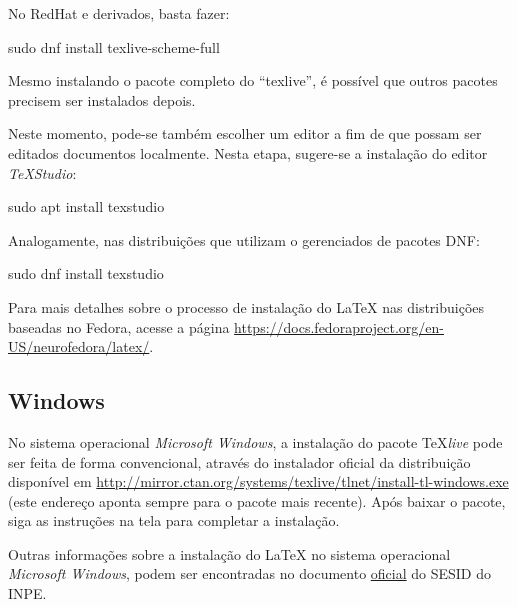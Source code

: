 No RedHat e derivados, basta fazer:

\begin{meucomando}
sudo dnf install texlive-scheme-full
\end{meucomando}

\begin{marker}
Mesmo instalando o pacote completo do ``texlive'', é possível que outros pacotes precisem ser instalados depois.
\end{marker}

Neste momento, pode-se também escolher um editor a fim de que possam ser editados documentos localmente. Nesta etapa, sugere-se a instalação do editor \textit{TeXStudio}:

\begin{meucomando}
sudo apt install texstudio
\end{meucomando}

Analogamente, nas distribuições que utilizam o gerenciados de pacotes DNF:

\begin{meucomando}
sudo dnf install texstudio
\end{meucomando}

\begin{marker}
Para mais detalhes sobre o processo de instalação do \LaTeX{} nas distribuições baseadas no Fedora, acesse a página \url{https://docs.fedoraproject.org/en-US/neurofedora/latex/}. 
\end{marker}

\subsection*{Windows}
\label{sec:windows}

No sistema operacional \textit{Microsoft Windows}, a instalação do pacote \TeX \textit{live} pode ser feita de forma convencional, através do instalador oficial da distribuição disponível em \url{http://mirror.ctan.org/systems/texlive/tlnet/install-tl-windows.exe} (este endereço aponta sempre para o pacote mais recente). Após baixar o pacote, siga as instruções na tela para completar a instalação.

\begin{marker}
Outras informações sobre a instalação do \LaTeX{} no sistema operacional \textit{Microsoft Windows}, podem ser encontradas no documento \href{http://mtc-m16d.sid.inpe.br/col/sid.inpe.br/mtc-m19@80/2010/03.24.15.12/doc/ambiente_latex_no_windows.pdf}{oficial} do SESID do INPE.
\end{marker}

